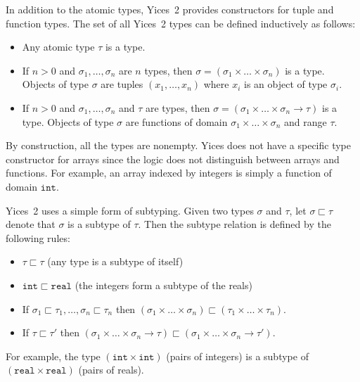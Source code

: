 \documentclass[11pt,twoside,fleqn,openright,titlepage]{cslreport}
\begin{document}
\medskip\noindent
In  addition to the  atomic types,  Yices~2 provides  constructors for
tuple and function types. The set  of all Yices~2 types can be defined
inductively as follows:
\begin{itemize}
\item Any atomic type $\tau$ is a type.
\item  If $n>0$  and  $\sigma_1,\ldots,\sigma_n$ are  $n$ types,  then
  $\sigma   =  (\sigma_1   \times  \ldots   \times  \sigma_n)$   is  a
  type. Objects of type  $\sigma$ are tuples $(x_1,\ldots, x_n)$ where
  $x_i$ is an object of type $\sigma_i$.
\item If  $n>0$ and  $\sigma_1,\ldots,\sigma_n$ and $\tau$  are types,
  then  $\sigma  =  (\sigma_1\times  \ldots\times\sigma_n  \rightarrow
  \tau)$ is a  type. Objects of type $\sigma$  are functions of domain
  $\sigma_1\times\ldots\times\sigma_n$ and range $\tau$.
\end{itemize}
By construction,  all the  types are nonempty.  Yices does not  have a
specific  type  constructor  for  arrays  since  the  logic  does  not
distinguish  between  arrays  and  functions. For  example,  an  array
indexed by integers is simply a function of domain $\mathtt{int}$.

\medskip\noindent
Yices~2 uses a simple form  of subtyping. Given two types $\sigma$ and
$\tau$, let $\sigma\sqsubset\tau$ denote that $\sigma$ is a subtype of
$\tau$. Then the subtype relation is defined by the following rules:
\begin{itemize}
\item $\tau\sqsubset\tau$ (any type is a subtype of itself)
\item   $\mathtt{int}\sqsubset\mathtt{real}$  (the  integers   form  a
  subtype of the reals)
\item If $\sigma_1\sqsubset\tau_1,\ldots,\sigma_n\sqsubset\tau_n$ then
$(\sigma_1\times \ldots\times\sigma_n)\sqsubset (\tau_1\times\ldots\times\tau_n)$.
\item If $\tau\sqsubset\tau'$ then
  $(\sigma_1\times\ldots\times\sigma_n\rightarrow\tau)\sqsubset
  (\sigma_1\times\ldots\times\sigma_n\rightarrow\tau')$.
\end{itemize}
For  example, the  type  $(\mathtt{int}\times\mathtt{int})$ (pairs  of
integers) is a  subtype of $(\mathtt{real}\times\mathtt{real})$ (pairs
of reals).
\end{document}
